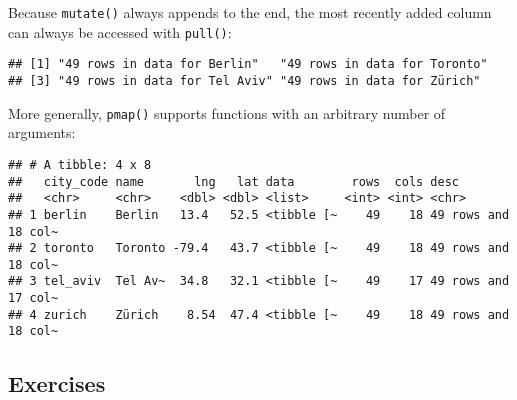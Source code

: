 \documentclass[]{book}
\newenvironment{Shaded}{\begin{snugshade}}{\end{snugshade}}
\newcommand{\DataTypeTok}[1]{\textcolor[rgb]{0.13,0.29,0.53}{#1}}
\newcommand{\DecValTok}[1]{\textcolor[rgb]{0.00,0.00,0.81}{#1}}
\newcommand{\KeywordTok}[1]{\textcolor[rgb]{0.13,0.29,0.53}{\textbf{#1}}}
\newcommand{\NormalTok}[1]{#1}
\newcommand{\OperatorTok}[1]{\textcolor[rgb]{0.81,0.36,0.00}{\textbf{#1}}}
\newcommand{\StringTok}[1]{\textcolor[rgb]{0.31,0.60,0.02}{#1}}
\begin{document}
Because \texttt{mutate()} always appends to the end, the most recently added column can always be accessed with \texttt{pull()}:

\begin{Shaded}
\end{Shaded}

\begin{verbatim}
## [1] "49 rows in data for Berlin"   "49 rows in data for Toronto" 
## [3] "49 rows in data for Tel Aviv" "49 rows in data for Zürich"
\end{verbatim}

More generally, \texttt{pmap()} supports functions with an arbitrary number of arguments:

\begin{Shaded}
\end{Shaded}

\begin{verbatim}
## # A tibble: 4 x 8
##   city_code name       lng   lat data        rows  cols desc               
##   <chr>     <chr>    <dbl> <dbl> <list>     <int> <int> <chr>              
## 1 berlin    Berlin   13.4   52.5 <tibble [~    49    18 49 rows and 18 col~
## 2 toronto   Toronto -79.4   43.7 <tibble [~    49    18 49 rows and 18 col~
## 3 tel_aviv  Tel Av~  34.8   32.1 <tibble [~    49    17 49 rows and 17 col~
## 4 zurich    Zürich    8.54  47.4 <tibble [~    49    18 49 rows and 18 col~
\end{verbatim}

\hypertarget{exercises-14}{%
\subsection{Exercises}\label{exercises-14}}
\end{document}
